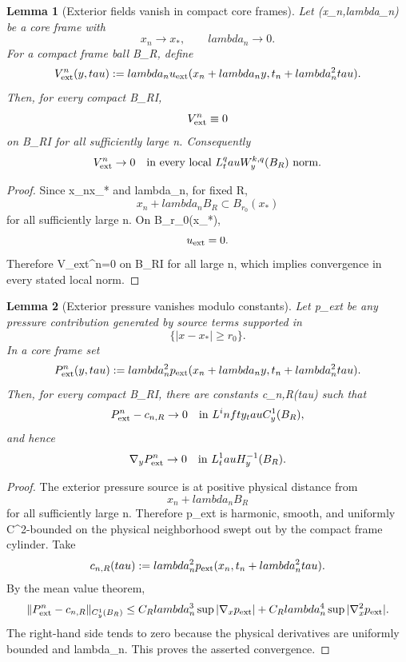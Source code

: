 \documentclass[11pt]{amsart}
\def\({}%
\def\){}%
\def\tau{tau}%
\def\lambda{lambda}%
\def\infty{infty}%
\theoremstyle{plain}
\newtheorem{lemma}[lemma]{Lemma}
\theoremstyle{definition}
\theoremstyle{remark}
\begin{document}
\begin{lemma}[Exterior fields vanish in compact core frames]
\label{paper8:lem:exterior-velocity-vanishes}
Let \((x_n,\lambda_n)\) be a core frame with
\[
  x_n\to x_*,
  \qquad
  \lambda_n\to0.
\]
For a compact frame ball \(B_R\), define
\[
  V_{\rm ext}^n(y,\tau)
  :=
  \lambda_nu_{\rm ext}(x_n+\lambda_ny,t_n+\lambda_n^2\tau).
\]
Then, for every compact \(B_R\times I\),
\[
  V_{\rm ext}^n\equiv0
\]
on \(B_R\times I\) for all sufficiently large \(n\).  Consequently
\[
  V_{\rm ext}^n\to0
  \quad\text{in every local }L^q_\tau W^{k,q}_y(B_R)\text{ norm}.
\]
\end{lemma}

\begin{proof}
Since \(x_n\to x_*\) and \(\lambda_n\), for fixed \(R\),
\[
  x_n+\lambda_nB_R\subset B_{r_0}(x_*)
\]
for all sufficiently large \(n\).  On \(B_{r_0}(x_*)\),
\[
  u_{\rm ext}=0.
\]
Therefore \(V_{\rm ext}^n=0\) on \(B_R\times I\) for all large \(n\), which
implies convergence in every stated local norm.
\end{proof}

\begin{lemma}[Exterior pressure vanishes modulo constants]
\label{paper8:lem:exterior-pressure-vanishes}
Let \(p_{\rm ext}\) be any pressure contribution generated by source terms
supported in
\[
  \{|x-x_*|\ge r_0\}.
\]
In a core frame set
\[
  P_{\rm ext}^n(y,\tau)
  :=
  \lambda_n^2p_{\rm ext}(x_n+\lambda_ny,t_n+\lambda_n^2\tau).
\]
Then, for every compact \(B_R\times I\), there are constants \(c_{n,R}(\tau)\)
such that
\[
  P_{\rm ext}^n-c_{n,R}
  \to0
  \quad\text{in }L^\infty_\tau C^1_y(B_R),
\]
and hence
\[
  \nabla_yP_{\rm ext}^n\to0
  \quad\text{in }L^1_\tau H^{-1}_y(B_R).
\]
\end{lemma}

\begin{proof}
The exterior pressure source is at positive physical distance from
\[
  x_n+\lambda_nB_R
\]
for all sufficiently large \(n\).  Therefore \(p_{\rm ext}\) is harmonic,
smooth, and uniformly \(C^2\)-bounded on the physical neighborhood swept out
by the compact frame cylinder.  Take
\[
  c_{n,R}(\tau)
  :=
  \lambda_n^2p_{\rm ext}(x_n,t_n+\lambda_n^2\tau).
\]
By the mean value theorem,
\[
  \|P_{\rm ext}^n-c_{n,R}\|_{C^1_y(B_R)}
  \le
  C_R\lambda_n^3\sup|\nabla_xp_{\rm ext}|
  +
  C_R\lambda_n^4\sup|\nabla_x^2p_{\rm ext}|.
\]
The right-hand side tends to zero because the physical derivatives are
uniformly bounded and \(\lambda_n\).  This proves the asserted
convergence.
\end{proof}
\end{document}
